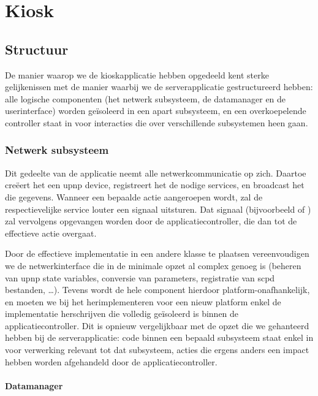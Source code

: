 \part{Kiosk}
\label{kiosk}

\chapter{Structuur}
\label{kiosk:structuur}

De manier waarop we de kioskapplicatie hebben opgedeeld kent sterke gelijkenissen met de manier waarbij we de serverapplicatie gestructureerd hebben: alle logische componenten (het netwerk subsysteem, de datamanager en de userinterface) worden geïsoleerd in een apart subsysteem, en een overkoepelende controller staat in voor interacties die over verschillende subsystemen heen gaan.

\section{Netwerk subsysteem}
\label{kiosk:structuur:netwerk}

Dit gedeelte van de applicatie neemt alle netwerkcommunicatie op zich. Daartoe creëert het een \ac{upnp} device, registreert het de nodige services, en broadcast het die gegevens. Wanneer een bepaalde actie aangeroepen wordt, zal de respectievelijke service louter een signaal uitsturen. Dat signaal (bijvoorbeeld  of ) zal vervolgens opgevangen worden door de applicatiecontroller, die dan tot de effectieve actie overgaat.

Door de effectieve implementatie in een andere klasse te plaatsen vereenvoudigen we de netwerkinterface die in de minimale opzet al complex genoeg is (beheren van \ac{upnp} state variables, conversie van parameters, registratie van \ac{scpd} bestanden, \ldots). Tevens wordt de hele component hierdoor platform-onafhankelijk, en moeten we bij het herimplementeren voor een nieuw platform enkel de implementatie herschrijven die volledig geïsoleerd is binnen de applicatiecontroller. Dit is opnieuw vergelijkbaar met de opzet die we gehanteerd hebben bij de serverapplicatie: code binnen een bepaald subsysteem staat enkel in voor verwerking relevant tot dat subsysteem, acties die ergens anders een impact hebben worden afgehandeld door de applicatiecontroller.

\subsection{Datamanager}
\label{kiosk:structuur:datamanager}

